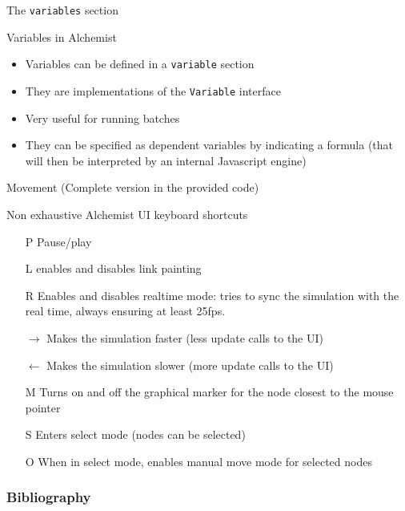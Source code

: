 \documentclass[presentation]{beamer}
\begin{document}
\begin{frame}[fragile]{The \texttt{variables} section}
\end{frame}

\begin{frame}[fragile]{Variables in Alchemist}
	\begin{itemize}
	  \item Variables can be defined in a \texttt{variable} section
	  \item They are implementations of the \texttt{Variable} interface
	  \item Very useful for running batches
	  \item They can be specified as dependent variables by indicating a formula (that will then be interpreted by an internal Javascript engine)
	\end{itemize}
\end{frame}


\begin{frame}[fragile]{Movement}
	(Complete version in the provided code)
\end{frame}

\begin{frame}[fragile]{Non exhaustive Alchemist UI keyboard shortcuts}
	\begin{itemize}
	  \item[P] Pause/play
	  \item[L] enables and disables link painting
	  \item[R] Enables and disables realtime mode: tries to sync the simulation with the real time, always ensuring at least 25fps.
	  \item[$\rightarrow{}$] Makes the simulation faster (less update calls to the UI)
	  \item[$\leftarrow{}$] Makes the simulation slower (more update calls to the UI)
	  \item[M] Turns on and off the graphical marker for the node closest to the mouse pointer
	  \item[S] Enters select mode (nodes can be selected)
	  \item[O] When in select mode, enables manual move mode for selected nodes
	\end{itemize}
\end{frame}


\begin{frame}[allowframebreaks]
  \frametitle{Bibliography}
  
  
\end{frame}
\end{document}
